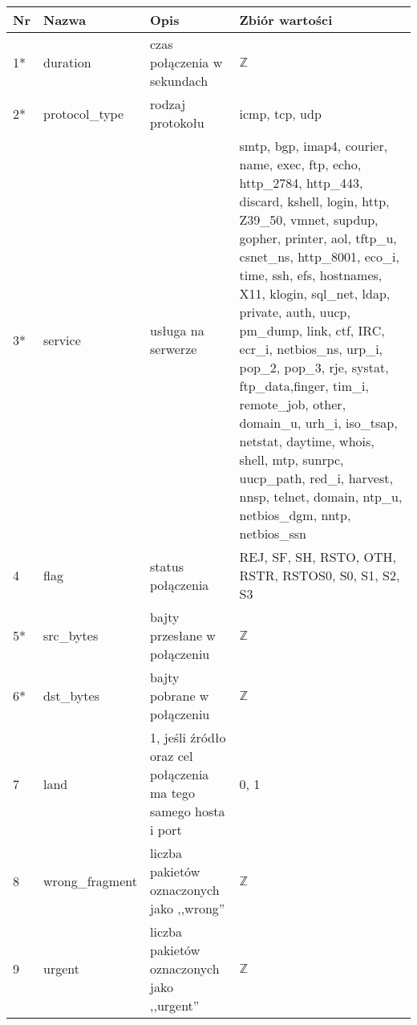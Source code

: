 \documentclass[a4paper, 12pt]{article}
\begin{document}
\begin{tabular}{ | l | p{3cm} | p{3cm} | p{6cm} | } \hline
Nr & Nazwa & Opis & Zbiór wartości \\ \hline
1*      & duration & czas połączenia w sekundach & $\mathbb{Z}$ \\ \hline
2*      & protocol\_type & rodzaj protokołu & icmp, tcp, udp \\ \hline
3*      & service & usługa na serwerze & smtp, bgp, imap4, courier, name, exec, ftp, echo, http\_2784,
                       http\_443, discard, kshell, login, http, Z39\_50, vmnet, supdup,
                       gopher, printer, aol, tftp\_u, csnet\_ns, http\_8001, eco\_i, time,
                       ssh, efs, hostnames, X11, klogin, sql\_net, ldap, private,
                       auth, uucp, pm\_dump, link, ctf, IRC, ecr\_i, netbios\_ns, urp\_i,
                       pop\_2, pop\_3, rje, systat, ftp\_data,finger, tim\_i, remote\_job,
                       other, domain\_u, urh\_i, iso\_tsap, netstat, daytime, whois, shell,
                       mtp, sunrpc, uucp\_path, red\_i, harvest, nnsp, telnet, domain,
                       ntp\_u, netbios\_dgm, nntp, netbios\_ssn \\ \hline
4      & flag & status połączenia & REJ, SF, SH, RSTO, OTH, RSTR, RSTOS0, S0, S1, S2, S3 \\ \hline
5*      & src\_bytes  & bajty przesłane w połączeniu & $\mathbb{Z}$ \\ \hline
6*      & dst\_bytes  & bajty pobrane w połączeniu  & $\mathbb{Z}$ \\ \hline
7      & land & 1, jeśli źródło oraz cel połączenia ma tego samego hosta i port & 0, 1 \\ \hline
8      & wrong\_fragment  & liczba pakietów oznaczonych jako ,,wrong'' & $\mathbb{Z}$ \\ \hline
9      & urgent  & liczba pakietów oznaczonych jako ,,urgent''  & $\mathbb{Z}$ \\ \hline
\end{tabular}
\end{document}
